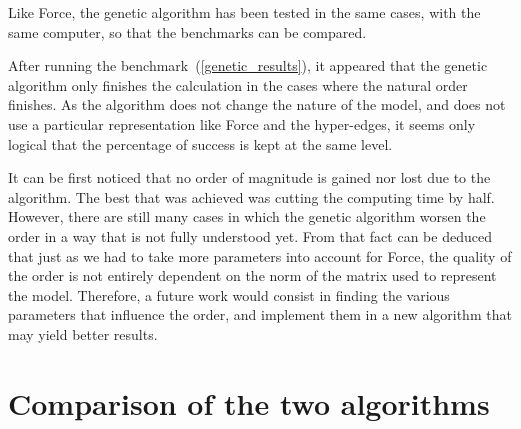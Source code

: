 \documentclass[12pt]{report}
\begin{document}
\begin{table}[!h]
  \begin{center}
    \hspace*{-0.52cm}
    \label{genetic_results}
    \caption{Experimental results using the genetic algorithm, compared to the natural order (in percentages)}
  \end{center}
\end{table}

Like Force, the genetic algorithm has been tested in the same cases, with the same computer, so that the benchmarks can be compared.

After running the benchmark~(\ref{genetic_results}), it appeared that the genetic algorithm only finishes the calculation in the cases where the natural order finishes. As the algorithm does not change the nature of the model, and does not use a particular representation like Force and the hyper-edges, it seems only logical that the percentage of success is kept at the same level.

It can be first noticed that no order of magnitude is gained nor lost due to the algorithm. The best that was achieved was cutting the computing time by half. However, there are still many cases in which the genetic algorithm worsen the order in a way that is not fully understood yet. From that fact can be deduced that just as we had to take more parameters into account for Force, the quality of the order is not entirely dependent on the norm of the matrix used to represent the model. Therefore, a future work would consist in finding the various parameters that influence the order, and implement them in a new algorithm that may yield better results.

\newpage
\section{Comparison of the two algorithms}
\end{document}
